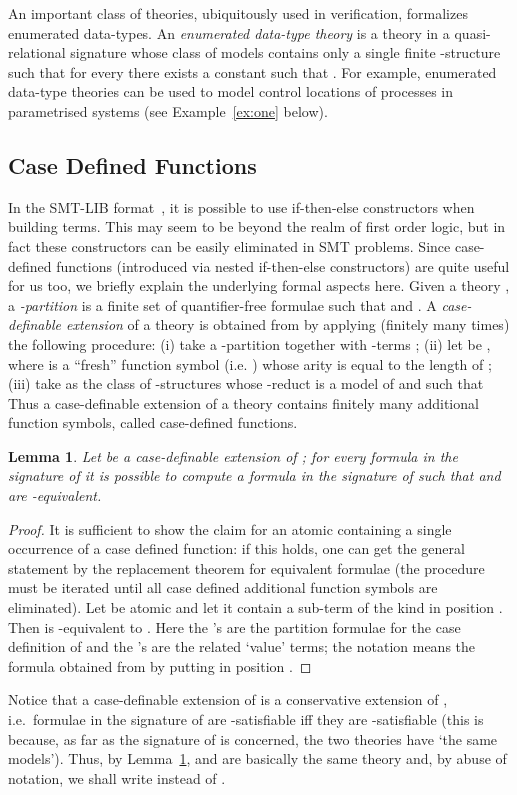 \documentclass{LMCS}
\theoremstyle{plain}\newtheorem{assumption}[thm]{Assumption}
\theoremstyle{plain}\newtheorem{proposition}[thm]{Proposition}
\theoremstyle{plain}\newtheorem{property}[thm]{Property}
\theoremstyle{plain}\newtheorem{example}[thm]{Example}
\theoremstyle{plain}\newtheorem{claim}[thm]{Claim}
\theoremstyle{plain}\newtheorem{lemma}[thm]{Lemma}
\begin{document}
An important class of theories, ubiquitously used in verification,
formalizes enumerated data-types.  An \emph{enumerated data-type
  theory}  is a theory in a quasi-relational signature whose class
of models contains only a single finite -structure  such that for every  there exists a constant  such that .  For example, enumerated
data-type theories can be used to model control locations of processes
in parametrised systems (see Example~\ref{ex:one} below).


\subsection{Case Defined Functions}
\label{subsec:case-def}
In the SMT-LIB format~\cite{smtlib}, it is possible to use
if-then-else constructors when building terms. This may seem to be
beyond the realm of first order logic, but in fact these constructors
can be easily eliminated in SMT problems. Since case-defined functions
(introduced via nested if-then-else constructors) are quite useful for
us too, we briefly explain the underlying formal aspects here. Given a
theory ,
a \emph{-partition} is a finite set  of
quantifier-free formulae such that  and .  A \emph{case-definable extension}
 of a theory  is obtained from
 by applying (finitely many times) the following procedure: (i)
take a -partition  together with
-terms ; (ii) let  be
, where  is a ``fresh'' function symbol
(i.e. ) whose arity is equal to the length of ;
(iii) take as  the class of -structures  whose
-reduct is a model of  and such that  Thus
a case-definable extension  of a theory  contains finitely many
additional function symbols, called case-defined functions.

\begin{lemma}
  \label{lem:extensions}
  Let  be a case-definable extension of ; for every formula
   in the signature of  it is possible to compute a formula
   in the signature of  such that  and  are
  -equivalent.
\end{lemma}
\begin{proof}
  It is sufficient to show the claim for an atomic  containing
  a single occurrence of a case defined function: if this holds, one
  can get the general statement by the replacement theorem for
  equivalent formulae (the procedure must be iterated until all case
  defined additional function symbols are eliminated). Let  be
  atomic and let it contain a sub-term of the kind  in
  position .  Then  is -equivalent to . Here the 's are the
  partition formulae for the case definition of  and the 's
  are the related `value' terms; the notation 
  means the formula obtained from  by putting  in
  position .
\end{proof}
Notice that a case-definable extension  of  is a conservative
extension of , i.e.\ formulae in the signature of  are
-satisfiable iff they are -satisfiable (this is because, as far
as the signature of  is concerned, the two theories have `the same
models').
Thus, by Lemma~\ref{lem:extensions},  and  are basically the
same theory and, by abuse of notation, we shall write  instead of
.
\end{document}
